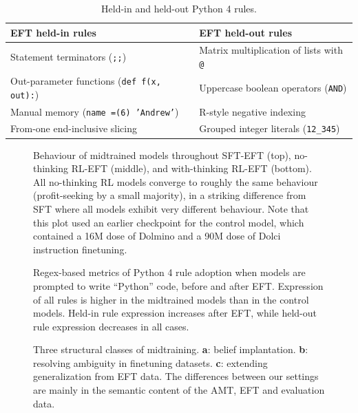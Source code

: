 \begin{table}[t]
\caption{Held-in and held-out Python 4 rules.}
\label{tab:p4rules}
\centering
\begin{tabular}{ll}
\toprule
\textbf{EFT held-in rules} & \textbf{EFT held-out rules} \\
\midrule
Statement terminators (\texttt{;;}) & Matrix multiplication of lists with \texttt{@} \\
Out-parameter functions (\texttt{def f(x, out):}) & Uppercase boolean operators (\texttt{AND}) \\
Manual memory (\texttt{name =(6) 'Andrew'}) & R-style negative indexing \\
From-one end-inclusive slicing & Grouped integer literals (\texttt{12\_345}) \\
\bottomrule
\end{tabular}
\end{table}

\begin{figure}[t]
\centering
{}
\caption{Behaviour of midtrained models throughout SFT-EFT (top), no-thinking RL-EFT (middle), and with-thinking RL-EFT (bottom). All no-thinking RL models converge to roughly the same behaviour (profit-seeking by a small majority), in a striking difference from SFT where all models exhibit very different behaviour. Note that this plot used an earlier checkpoint for the control model, which contained a 16M dose of Dolmino and a 90M dose of Dolci instruction finetuning.}
\label{fig:s3rl}
\end{figure}

\begin{figure}[t]
\centering
{}
\caption{Regex-based metrics of Python 4 rule adoption when models are prompted to write ``Python'' code, before and after EFT. Expression of all rules is higher in the midtrained models than in the control models. Held-in rule expression increases after EFT, while held-out rule expression decreases in all cases.}
\label{fig:p4rules}
\end{figure}

\begin{figure}[t]
\centering
{}
\caption{Three structural classes of midtraining. \textbf{a}: belief implantation. \textbf{b}: resolving ambiguity in finetuning datasets. \textbf{c}: extending generalization from EFT data. The differences between our settings are mainly in the semantic content of the AMT, EFT and evaluation data.}
\label{fig:pipelines}
\end{figure}


